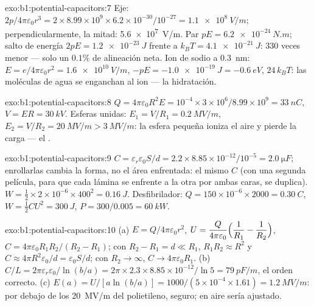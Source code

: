 \begin{solution}{exo:b1:potential-capacitors:7}
Eje: $2p/4\pi\varepsilon_0r^3 = 2 \times 8.99 \times 10^9 \times 6.2 \times 10^{-30}/10^{-27} =
\qty{1.1e8}{V/m}$; perpendicularmente, la mitad: \qty{5.6e7}{V/m}. Par $pE =
\qty{6.2e-24}{N.m}$; salto de energía $2pE = \qty{1.2e-23}{J}$ frente a $k_BT =
\qty{4.1e-21}{J}$: $330$ veces menor --- solo un $0.1\%$ de alineación neta.
Ion de sodio a \qty{0.3}{nm}: $E = e/4\pi\varepsilon_0r^2 = \qty{1.6e10}{V/m}$, $-pE
= \qty{-1.0e-19}{J} = \qty{-0.6}{eV}$, $24\,k_BT$: las moléculas de agua se
enganchan al ion --- la hidratación.
\end{solution}

\begin{solution}{exo:b1:potential-capacitors:8}
$Q = 4\pi\varepsilon_0R^2E = 10^{-4} \times 3 \times 10^6/8.99 \times 10^9 = \qty{33}{nC}$,
$V = ER = \qty{30}{kV}$. Esferas unidas: $E_1 = V/R_1 = \qty{0.2}{MV/m}$,
$E_2 = V/R_2 = \qty{20}{MV/m} > \qty{3}{MV/m}$: la esfera pequeña ioniza el
aire y pierde la carga --- el .
\end{solution}

\begin{solution}{exo:b1:potential-capacitors:9}
$C = \varepsilon_r\varepsilon_0S/d = 2.2 \times 8.85 \times 10^{-12}/10^{-5} = \qty{2.0}{\micro F}$;
enrollarlas cambia la forma, no el área enfrentada: el mismo $C$ (con una
segunda película, para que cada lámina se enfrente a la otra por ambas
caras, se duplica).
$W = \tfrac12 \times 2 \times 10^{-6} \times 400^2 = \qty{0.16}{J}$. Desfibrilador:
$Q = 150 \times 10^{-6} \times 2000 = \qty{0.30}{C}$, $W = \tfrac12CU^2 = \qty{300}{J}$,
$P = 300/0.005 = \qty{60}{kW}$.
\end{solution}

\begin{solution}{exo:b1:potential-capacitors:10}
(a) $E = Q/4\pi\varepsilon_0r^2$, $U = \dfrac{Q}{4\pi\varepsilon_0}\Bigl(\dfrac1{R_1} -
\dfrac1{R_2}\Bigr)$, $C = 4\pi\varepsilon_0R_1R_2/(R_2 - R_1)$; con $R_2 - R_1 = d \ll
R_1$, $R_1R_2 \approx R^2$ y $C \approx 4\pi R^2\varepsilon_0/d = \varepsilon_0S/d$; con $R_2 \to
\infty$, $C \to 4\pi\varepsilon_0R_1$. (b) $C/L = 2\pi\varepsilon_r\varepsilon_0/\ln(b/a) = 2\pi \times 2.3
\times 8.85 \times 10^{-12}/\ln5 = \qty{79}{pF/m}$, el orden correcto. (c) $E(a) =
U/[a\ln(b/a)] = 1000/(5 \times 10^{-4} \times 1.61) = \qty{1.2}{MV/m}$: por debajo de los
\qty{20}{MV/m} del polietileno, seguro; en aire sería ajustado.
\end{solution}

